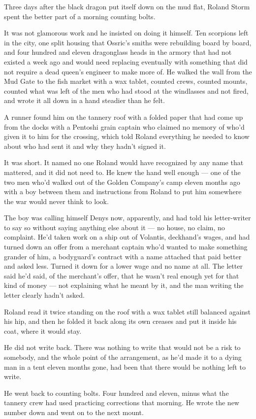 \sceneBreak

Three days after the black dragon put itself down on the mud flat, Roland Storm spent the better part of a morning counting bolts.

It was not glamorous work and he insisted on doing it himself. Ten scorpions left in the city, one split housing that Ossric’s smiths were rebuilding board by board, and four hundred and eleven dragonglass heads in the armory that had not existed a week ago and would need replacing eventually with something that did not require a dead queen’s engineer to make more of. He walked the wall from the Mud Gate to the fish market with a wax tablet, counted crews, counted mounts, counted what was left of the men who had stood at the windlasses and not fired, and wrote it all down in a hand steadier than he felt.

A runner found him on the tannery roof with a folded paper that had come up from the docks with a Pentoshi grain captain who claimed no memory of who’d given it to him for the crossing, which told Roland everything he needed to know about who had sent it and why they hadn’t signed it.

It was short. It named no one Roland would have recognized by any name that mattered, and it did not need to. He knew the hand well enough — one of the two men who’d walked out of the Golden Company’s camp eleven months ago with a boy between them and instructions from Roland to put him somewhere the war would never think to look.

The boy was calling himself Denys now, apparently, and had told his letter-writer to say so without saying anything else about it — no house, no claim, no complaint. He’d taken work on a ship out of Volantis, deckhand’s wages, and had turned down an offer from a merchant captain who’d wanted to make something grander of him, a bodyguard’s contract with a name attached that paid better and asked less. Turned it down for a lower wage and no name at all. The letter said he’d said, of the merchant’s offer, that he wasn’t real enough yet for that kind of money — not explaining what he meant by it, and the man writing the letter clearly hadn’t asked.

Roland read it twice standing on the roof with a wax tablet still balanced against his hip, and then he folded it back along its own creases and put it inside his coat, where it would stay.

He did not write back. There was nothing to write that would not be a risk to somebody, and the whole point of the arrangement, as he’d made it to a dying man in a tent eleven months gone, had been that there would be nothing left to write.

He went back to counting bolts. Four hundred and eleven, minus what the tannery crew had used practicing corrections that morning. He wrote the new number down and went on to the next mount.